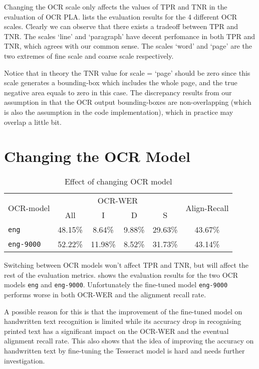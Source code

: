 Changing the OCR scale only affects the values of TPR and TNR in the evaluation of OCR PLA.  lists the evaluation results for the 4 different OCR scales. Clearly we can observe that there exists a tradeoff between TPR and TNR. The scales `line' and `paragraph' have decent perfomance in both TPR and TNR, which agrees with our common sense. The scales `word' and `page' are the two extremes of fine scale and coarse scale respectively.

Notice that in theory the TNR value for scale = `page' should be zero since this scale generates a bounding-box which includes the whole page, and the true negative area equals to zero in this case. The discrepancy results from our assumption in  that the OCR output bounding-boxes are non-overlapping (which is also the assumption in the code implementation), which in practice may overlap a little bit.

\section{Changing the OCR Model}

\begin{table}[!tb]
    \caption{Effect of changing OCR model}
    \centering
    \label{tab:eval-res-ocr-model}
    \begin{tabular}{l c c c c c}
    \toprule
    \multirow{2}{*}{OCR-model} &\multicolumn{4}{c}{OCR-WER} & \multirow{2}{*}{Align-Recall} \\
    \cmidrule{2-5}
     & All & I & D & S & \\
    \midrule
    \texttt{eng} & 48.15\%&8.64\%&9.88\%&29.63\%&43.67\%\\
    \texttt{eng-9000} & 52.22\%&11.98\%&8.52\%&31.73\%&43.14\%\\
    \bottomrule
    \end{tabular}
\end{table}

Switching between OCR models won't affect TPR and TNR, but will affect the rest of the evaluation metrics.  shows the evaluation results for the two OCR models \texttt{eng} and \texttt{eng-9000}. Unfortunately the fine-tuned model \texttt{eng-9000} performs worse in both OCR-WER and the alignment recall rate.

A possible reason for this is that the improvement of the fine-tuned model on handwritten text recognition is limited while its accuracy drop in recognising printed text has a significant impact on the OCR-WER and the eventual alignment recall rate. This also shows that the idea of improving the accuracy on handwritten text by fine-tuning the Tesseract model is hard and needs further investigation.

